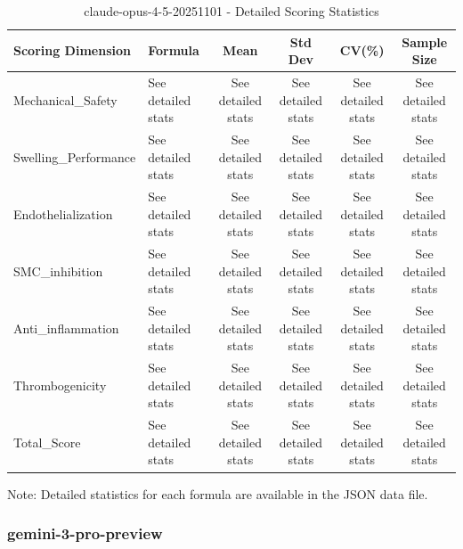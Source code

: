 \documentclass[12pt,a4paper]{article}
\begin{document}
\begin{table}[H]
\centering
\caption{claude-opus-4-5-20251101 - Detailed Scoring Statistics}
\small
\begin{tabular}{llcccc}
\toprule
\textbf{Scoring Dimension} & \textbf{Formula} & \textbf{Mean} & \textbf{Std Dev} & \textbf{CV(\%)} & \textbf{Sample Size} \\
\midrule
Mechanical\_Safety & See detailed stats & See detailed stats & See detailed stats & See detailed stats & See detailed stats \\
Swelling\_Performance & See detailed stats & See detailed stats & See detailed stats & See detailed stats & See detailed stats \\
Endothelialization & See detailed stats & See detailed stats & See detailed stats & See detailed stats & See detailed stats \\
SMC\_inhibition & See detailed stats & See detailed stats & See detailed stats & See detailed stats & See detailed stats \\
Anti\_inflammation & See detailed stats & See detailed stats & See detailed stats & See detailed stats & See detailed stats \\
Thrombogenicity & See detailed stats & See detailed stats & See detailed stats & See detailed stats & See detailed stats \\
Total\_Score & See detailed stats & See detailed stats & See detailed stats & See detailed stats & See detailed stats \\
\bottomrule
\end{tabular}
\end{table}

Note: Detailed statistics for each formula are available in the JSON data file.

\subsubsection{gemini-3-pro-preview}
\end{document}
